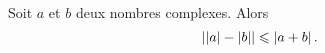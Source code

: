 \documentclass{magnoliaold}
\begin{document}

\begin{proposition}[utile=-3,nom={Seconde inégalité triangulaire}]
Soit $a$ et $b$ deux nombres complexes. Alors
\[\left|\left|a\right|-\left|b\right|\right|\leqslant\left|a+b\right|.\]
\end{proposition}
\end{document}
